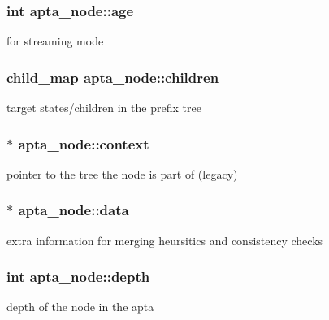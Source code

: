 \subsubsection[{\texorpdfstring{age}{age}}]{\setlength{\rightskip}{0pt plus 5cm}int apta\+\_\+node\+::age}\hypertarget{classapta__node_a24d4af165b37f04090c85df1ef3ac997}{}\label{classapta__node_a24d4af165b37f04090c85df1ef3ac997}
for streaming mode 
\subsubsection[{\texorpdfstring{children}{children}}]{\setlength{\rightskip}{0pt plus 5cm}child\+\_\+map apta\+\_\+node\+::children}\hypertarget{classapta__node_a04c0ef7f20669b97f2c5c65edc4c044c}{}\label{classapta__node_a04c0ef7f20669b97f2c5c65edc4c044c}
target states/children in the prefix tree 
\subsubsection[{\texorpdfstring{context}{context}}]{$\ast$ apta\+\_\+node\+::context}\hypertarget{classapta__node_ae216b528459a269d45957a919a6180e8}{}\label{classapta__node_ae216b528459a269d45957a919a6180e8}
pointer to the tree the node is part of (legacy) 
\subsubsection[{\texorpdfstring{data}{data}}]{$\ast$ apta\+\_\+node\+::data}\hypertarget{classapta__node_a9b2762e845a7776004e7edab7dae8718}{}\label{classapta__node_a9b2762e845a7776004e7edab7dae8718}
extra information for merging heursitics and consistency checks 
\subsubsection[{\texorpdfstring{depth}{depth}}]{\setlength{\rightskip}{0pt plus 5cm}int apta\+\_\+node\+::depth}\hypertarget{classapta__node_af55f64e7181c083d997bdf8b85cbe4d8}{}\label{classapta__node_af55f64e7181c083d997bdf8b85cbe4d8}
depth of the node in the apta 
